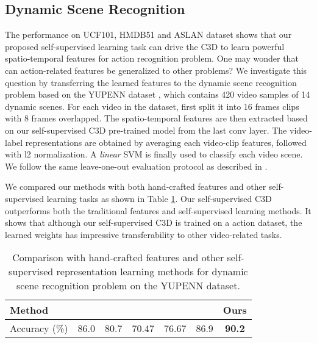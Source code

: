 \documentclass[10pt,twocolumn,letterpaper]{article}
\begin{document}
\subsection{Dynamic Scene Recognition}
The performance on UCF101, HMDB51 and ASLAN dataset shows that our proposed self-supervised learning task can drive the C3D to learn powerful spatio-temporal features for action recognition problem. One may wonder that can action-related features be generalized to other problems? We investigate this question by transferring the learned features to the dynamic scene recognition problem based on the YUPENN dataset \cite{derpanis2012dynamic}, which contains 420 video samples of 14 dynamic scenes. For each video in the dataset, first split it into 16 frames clips with 8 frames overlapped. The spatio-temporal features are then extracted based on our self-supervised C3D pre-trained model from the last conv layer. The video-label representations are obtained by averaging each video-clip features, followed with l2 normalization. A \textit{linear} SVM is finally used to classify each video scene. We follow the same leave-one-out evaluation protocol as described in \cite{derpanis2012dynamic}. 

We compared our methods with both hand-crafted features and other self-supervised learning tasks as shown in Table \ref{YUPENN}. Our self-supervised C3D outperforms both the traditional features and self-supervised learning methods. It shows that although our self-supervised C3D is trained on a action dataset, the learned weights has impressive transferability to other video-related tasks. 


\begin{table}
\begin{center}
\caption{Comparison with hand-crafted features and other self-supervised representation learning methods for dynamic scene recognition problem on the YUPENN dataset.}
\vspace{-6pt}
\begin{adjustbox}{max width=\columnwidth}
\begin{tabular}{lcccccc}
\toprule
Method & \cite{feichtenhofer2013spacetime} & \cite{derpanis2012dynamic} & \cite{wang2015unsupervised} & \cite{misra2016shuffle} & \cite{gan2018geometry} & \textbf{Ours} \\
\midrule
Accuracy (\%)  &  86.0 & 80.7 & 70.47 & 76.67 & 86.9 & \textbf{90.2}\\
\bottomrule
\end{tabular}
\label{YUPENN}
\end{adjustbox}
\end{center}\vspace{-7mm}
\end{table}
\end{document}

